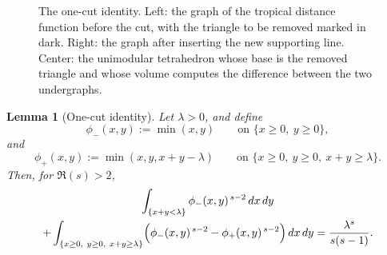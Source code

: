 \documentclass[a4paper,american,11pt]{amsart}
\theoremstyle{plain}
\newtheorem{lemma}[theorem]{Lemma}
\theoremstyle{definition}
\begin{document}
\begin{figure}

\caption{The one-cut identity. Left: the graph of the tropical distance
function before the cut, with the triangle to be removed marked in dark.
Right: the graph after inserting the new supporting line. Center: the
unimodular tetrahedron whose base is the removed triangle and whose volume
computes the difference between the two undergraphs.}
\label{fig:rectangularonecut3d}
\end{figure}

\begin{lemma}[One-cut identity]\label{lem:onecut}
Let \(\lambda>0\), and define
\[
\phi_-(x,y):=\min(x,y)
\qquad\text{on } \{x\ge0,\ y\ge0\},
\]
and
\[
\phi_+(x,y):=\min(x,y,x+y-\lambda)
\qquad\text{on } \{x\ge0,\ y\ge0,\ x+y\ge\lambda\}.
\]
Then, for \(\Re(s)>2\),
\begin{multline*}
\int_{\{x+y<\lambda\}}\phi_-(x,y)^{\,s-2}\,dx\,dy \\
+
\int_{\{x\ge0,\ y\ge0,\ x+y\ge\lambda\}}
\Bigl(\phi_-(x,y)^{\,s-2}-\phi_+(x,y)^{\,s-2}\Bigr)\,dx\,dy
=
\frac{\lambda^s}{s(s-1)}.
\end{multline*}
\end{lemma}
\end{document}
